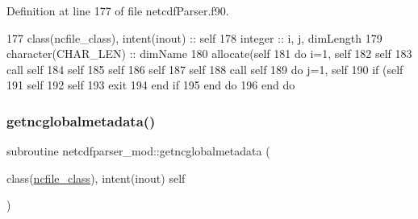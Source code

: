 Definition at line 177 of file netcdf\+Parser.\+f90.


\begin{DoxyCode}
177     \textcolor{keywordtype}{class}(ncfile\_class), \textcolor{keywordtype}{intent(inout)} :: self
178     \textcolor{keywordtype}{integer} :: i, j, dimLength
179     \textcolor{keywordtype}{character(CHAR\_LEN)} :: dimName
180     \textcolor{keyword}{allocate}(self%
181     \textcolor{keywordflow}{do} i=1, self%
182         self%
183         \textcolor{keyword}{call }self%
184         self%
185         self%
186         self%
187         self%
188         \textcolor{keyword}{call }self%
189         \textcolor{keywordflow}{do} j=1, self%
190             \textcolor{keywordflow}{if} (self%
191                 self%
192                 self%
193                 \textcolor{keywordflow}{exit}
194 \textcolor{keywordflow}{            end if}
195 \textcolor{keywordflow}{        end do}
196 \textcolor{keywordflow}{    end do}
\end{DoxyCode}
\mbox{\label{namespacenetcdfparser__mod_a409f59662d71fb63e5fb5e057fdfd6ee}} 
\subsubsection{\texorpdfstring{getncglobalmetadata()}{getncglobalmetadata()}}
{\footnotesize\ttfamily subroutine netcdfparser\+\_\+mod\+::getncglobalmetadata (\begin{DoxyParamCaption}\item[{class(\mbox{\hyperlink{structnetcdfparser__mod_1_1ncfile__class}{ncfile\+\_\+class}}), intent(inout)}]{self }\end{DoxyParamCaption})\hspace{0.3cm}{\ttfamily [private]}}



